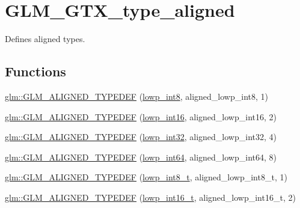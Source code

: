 \hypertarget{group__gtx__type__aligned}{}\section{G\+L\+M\+\_\+\+G\+T\+X\+\_\+type\+\_\+aligned}
\label{group__gtx__type__aligned}


Defines aligned types.  


\subsection*{Functions}
\begin{DoxyCompactItemize}
\item 
\mbox{\hyperlink{group__gtx__type__aligned_gab5cd5c5fad228b25c782084f1cc30114}{glm\+::\+G\+L\+M\+\_\+\+A\+L\+I\+G\+N\+E\+D\+\_\+\+T\+Y\+P\+E\+D\+EF}} (\mbox{\hyperlink{group__gtc__type__precision_gaf9e675b6392764242ae87eb179e9d3d6}{lowp\+\_\+int8}}, aligned\+\_\+lowp\+\_\+int8, 1)
\item 
\mbox{\hyperlink{group__gtx__type__aligned_ga5bb5dd895ef625c1b113f2cf400186b0}{glm\+::\+G\+L\+M\+\_\+\+A\+L\+I\+G\+N\+E\+D\+\_\+\+T\+Y\+P\+E\+D\+EF}} (\mbox{\hyperlink{group__gtc__type__precision_ga71fc0c399fa4780507748b643733f153}{lowp\+\_\+int16}}, aligned\+\_\+lowp\+\_\+int16, 2)
\item 
\mbox{\hyperlink{group__gtx__type__aligned_gac6efa54cf7c6c86f7158922abdb1a430}{glm\+::\+G\+L\+M\+\_\+\+A\+L\+I\+G\+N\+E\+D\+\_\+\+T\+Y\+P\+E\+D\+EF}} (\mbox{\hyperlink{group__gtc__type__precision_gad9939c9d6fec1c6accc02a83c6500f08}{lowp\+\_\+int32}}, aligned\+\_\+lowp\+\_\+int32, 4)
\item 
\mbox{\hyperlink{group__gtx__type__aligned_ga6612eb77c8607048e7552279a11eeb5f}{glm\+::\+G\+L\+M\+\_\+\+A\+L\+I\+G\+N\+E\+D\+\_\+\+T\+Y\+P\+E\+D\+EF}} (\mbox{\hyperlink{group__gtc__type__precision_gab8a8e75af347592406e41b3ae2c0712b}{lowp\+\_\+int64}}, aligned\+\_\+lowp\+\_\+int64, 8)
\item 
\mbox{\hyperlink{group__gtx__type__aligned_ga7ddc1848ff2223026db8968ce0c97497}{glm\+::\+G\+L\+M\+\_\+\+A\+L\+I\+G\+N\+E\+D\+\_\+\+T\+Y\+P\+E\+D\+EF}} (\mbox{\hyperlink{group__gtc__type__precision_gae6092311f6970a305c2df19a372360a3}{lowp\+\_\+int8\+\_\+t}}, aligned\+\_\+lowp\+\_\+int8\+\_\+t, 1)
\item 
\mbox{\hyperlink{group__gtx__type__aligned_ga22240dd9458b0f8c11fbcc4f48714f68}{glm\+::\+G\+L\+M\+\_\+\+A\+L\+I\+G\+N\+E\+D\+\_\+\+T\+Y\+P\+E\+D\+EF}} (\mbox{\hyperlink{group__gtc__type__precision_gae34c3d53c4c1434fc9f26538b0185667}{lowp\+\_\+int16\+\_\+t}}, aligned\+\_\+lowp\+\_\+int16\+\_\+t, 2)

\end{DoxyCompactItemize}
